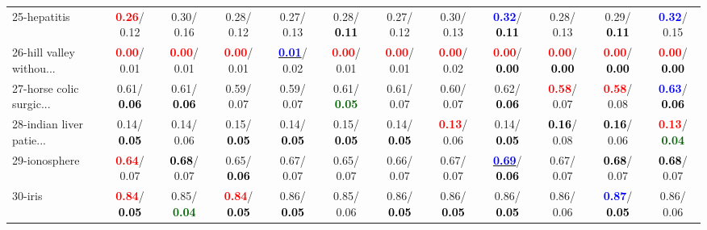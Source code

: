 \begin{table}[h]
\begin{center}
{\begin{tabular}{lc|c|c|c|c|c|c|c|c|c|c}
25-hepatitis & \textcolor{red}{\textbf{  0.26}}/  0.12 &   0.30/  0.16 &   0.28/  0.12 &   0.27/  0.13 &   0.28/\textcolor{black}{\textbf{  0.11}} &   0.27/  0.12 &   0.30/  0.13 & \textcolor{blue}{\textbf{  0.32}}/\textcolor{black}{\textbf{  0.11}} &   0.28/  0.13 &   0.29/\textcolor{black}{\textbf{  0.11}} & \textcolor{blue}{\textbf{  0.32}}/  0.15 \\
26-hill valley withou... & \textcolor{red}{\textbf{  0.00}}/  0.01 & \textcolor{red}{\textbf{  0.00}}/  0.01 & \textcolor{red}{\textbf{  0.00}}/  0.01 & \underline{\textcolor{blue}{\textbf{  0.01}}}/  0.02 & \textcolor{red}{\textbf{  0.00}}/  0.01 & \textcolor{red}{\textbf{  0.00}}/  0.01 & \textcolor{red}{\textbf{  0.00}}/  0.02 & \textcolor{red}{\textbf{  0.00}}/\textcolor{black}{\textbf{  0.00}} & \textcolor{red}{\textbf{  0.00}}/\textcolor{black}{\textbf{  0.00}} & \textcolor{red}{\textbf{  0.00}}/\textcolor{black}{\textbf{  0.00}} & \textcolor{red}{\textbf{  0.00}}/\textcolor{black}{\textbf{  0.00}} \\
27-horse colic surgic... &   0.61/\textcolor{black}{\textbf{  0.06}} &   0.61/\textcolor{black}{\textbf{  0.06}} &   0.59/  0.07 &   0.59/  0.07 &   0.61/\textcolor{darkgreen}{\textbf{  0.05}} &   0.61/  0.07 &   0.60/  0.07 &   0.62/\textcolor{black}{\textbf{  0.06}} & \textcolor{red}{\textbf{  0.58}}/  0.07 & \textcolor{red}{\textbf{  0.58}}/  0.08 & \textcolor{blue}{\textbf{  0.63}}/\textcolor{black}{\textbf{  0.06}} \\
28-indian liver patie... &   0.14/\textcolor{black}{\textbf{  0.05}} &   0.14/  0.06 &   0.15/\textcolor{black}{\textbf{  0.05}} &   0.14/\textcolor{black}{\textbf{  0.05}} &   0.15/\textcolor{black}{\textbf{  0.05}} &   0.14/\textcolor{black}{\textbf{  0.05}} & \textcolor{red}{\textbf{  0.13}}/  0.06 &   0.14/\textcolor{black}{\textbf{  0.05}} & \textcolor{black}{\textbf{  0.16}}/  0.08 & \textcolor{black}{\textbf{  0.16}}/  0.06 & \textcolor{red}{\textbf{  0.13}}/\textcolor{darkgreen}{\textbf{  0.04}} \\ \hline
29-ionosphere & \textcolor{red}{\textbf{  0.64}}/  0.07 & \textcolor{black}{\textbf{  0.68}}/  0.07 &   0.65/\textcolor{black}{\textbf{  0.06}} &   0.67/  0.07 &   0.65/  0.07 &   0.66/  0.07 &   0.67/  0.07 & \underline{\textcolor{blue}{\textbf{  0.69}}}/\textcolor{black}{\textbf{  0.06}} &   0.67/  0.07 & \textcolor{black}{\textbf{  0.68}}/  0.07 & \textcolor{black}{\textbf{  0.68}}/  0.07 \\
30-iris & \textcolor{red}{\textbf{  0.84}}/\textcolor{black}{\textbf{  0.05}} &   0.85/\textcolor{darkgreen}{\textbf{  0.04}} & \textcolor{red}{\textbf{  0.84}}/\textcolor{black}{\textbf{  0.05}} &   0.86/\textcolor{black}{\textbf{  0.05}} &   0.85/  0.06 &   0.86/\textcolor{black}{\textbf{  0.05}} &   0.86/\textcolor{black}{\textbf{  0.05}} &   0.86/\textcolor{black}{\textbf{  0.05}} &   0.86/  0.06 & \textcolor{blue}{\textbf{  0.87}}/\textcolor{black}{\textbf{  0.05}} &   0.86/  0.06 \\

\end{tabular}}
\end{center}
\end{table}
